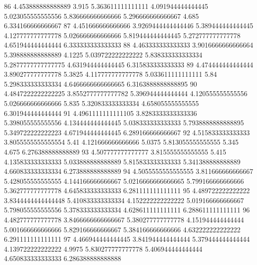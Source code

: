 86 4.453888888888889 3.915 5.363611111111111 4.091944444444445 5.023055555555556 5.836666666666666 5.296666666666667 4.685 6.334166666666667
87 4.451666666666666 3.9269444444444446 5.389444444444445 4.127777777777778 5.026666666666666 5.819444444444445 5.272777777777778 4.651944444444444 6.333333333333333
88 4.463333333333333 3.9016666666666664 5.398888888888889 4.1225 5.039722222222222 5.838333333333334 5.2877777777777775 4.631944444444445 6.315833333333333
89 4.474444444444444 3.890277777777778 5.3825 4.117777777777778 5.033611111111111 5.84 5.298333333333334 4.6466666666666665 6.3163888888888895
90 4.4847222222222225 3.8552777777777782 5.396944444444444 4.120555555555556 5.026666666666666 5.835 5.320833333333334 4.658055555555555 6.301944444444444
91 4.4961111111111105 3.8283333333333336 5.398055555555556 4.134444444444445 5.038333333333333 5.7938888888888895 5.349722222222223 4.671944444444445 6.289166666666667
92 4.515833333333333 3.8055555555555554 5.41 4.121666666666666 5.0375 5.813055555555555 5.345 4.675 6.276388888888889
93 4.507777777777777 3.815555555555555 5.415 4.135833333333333 5.033888888888889 5.815833333333333 5.341388888888889 4.660833333333334 6.273888888888889
94 4.5055555555555555 3.811666666666667 5.428055555555555 4.144166666666667 5.0216666666666665 5.799166666666666 5.362777777777778 4.645833333333333 6.281111111111111
95 4.489722222222222 3.8344444444444448 5.410833333333334 4.152222222222222 5.019166666666667 5.798055555555556 5.378333333333334 4.628611111111111 6.288611111111111
96 4.482777777777778 3.8466666666666667 5.380277777777778 4.151944444444444 5.001666666666666 5.829166666666667 5.384166666666666 4.632222222222222 6.291111111111111
97 4.466944444444445 3.841944444444444 5.379444444444444 4.139722222222222 4.9975 5.830277777777778 5.406944444444444 4.650833333333333 6.286388888888888
